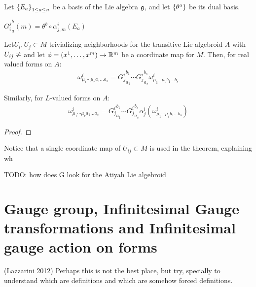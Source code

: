 Let $\left\{ E_a \right\}_{1 \leq a \leq n}$ be a basis of the Lie algebra $\mathfrak{g}$, and let $\left\{ \theta^a \right\}$ be its dual basis.

\begin{definition}
    ${G_i^j}_a^b(m) = \theta^b \circ \alpha^i_{j, m}(E_a)$
\end{definition}

\begin{theorem}
Let$U_i, U_j \subset M$ trivializing neighborhoods for the transitive Lie algebroid $A$ with $U_{ij} \neq \empty$ and let $\phi = (x^1, \dots, x^m) \to \RR^m$ be a coordinate map for $M$. Then, for real valued forms on $A$:
\begin{align}
    \omega^i_{\mu_1 \cdots \mu_r a_1 \dots a_s} = {G^i_j}^{b_1}_{a_1} \cdots {G^i_j}^{b_s}_{a_s} \omega^i_{\mu_1 \cdots \mu_r b_1 \dots b_s}
\end{align}

Similarly, for $L$-valued forms on $A$:
\begin{align}
    \omega^i_{\mu_1 \cdots \mu_r a_1 \dots a_s} = {G^i_j}^{b_1}_{a_1} \cdots {G^i_j}^{b_s}_{a_s} \alpha^i_j(\omega^i_{\mu_1 \cdots \mu_r b_1 \dots b_s})
\end{align}
\end{theorem}
\begin{proof}

\end{proof}
\begin{remark}
Notice that a single coordinate map of $U_{ij} \subset M$ is used in the theorem, explaining wh
\end{remark}

TODO: how does G look for the Atiyah Lie algebroid
\section{Gauge group, Infinitesimal Gauge transformations and Infinitesimal gauge action on forms}

(Lazzarini 2012) Perhaps this is not the best place, but try, specially to understand which are definitions and which are somehow forced definitions.

